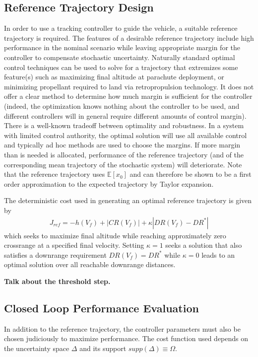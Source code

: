 \documentclass[10pt,a4paper]{article}
\begin{document}
		

	\subsection{Reference Trajectory Design}
	In order to use a tracking controller to guide the vehicle, a suitable reference trajectory is required. The features of a desirable reference trajectory include high performance in the nominal scenario while leaving appropriate margin for the controller to compensate stochastic uncertainty. Naturally standard optimal control techniques can be used to solve for a trajectory that extremizes some feature(s) such as maximizing final altitude at parachute deployment, or minimizing propellant required to land via retropropulsion technology. It does not offer a clear method to determine how much margin is sufficient for the controller (indeed, the optimization knows nothing about the controller to be used, and different controllers will in general require different amounts of control margin). There is a well-known tradeoff between optimality and robustness. In a system with limited control authority, the optimal solution will use all available control and typically ad hoc methods are used to choose the margins. If more margin than is needed is allocated, performance of the reference trajectory (and of the corresponding mean trajectory of the stochastic system) will deteriorate. Note that the reference trajectory uses $ \mathbb{E}[x_0] $ and can therefore be shown to be a first order approximation to the expected trajectory by Taylor expansion.
	
	The deterministic cost used in generating an optimal reference trajectory is given by 
	\begin{align}
	J_{ref} = -h(V_f) + |CR(V_f)| + \kappa|DR(V_f)-DR^*| \label{eq_cost_deterministic}
	\end{align}
	which seeks to maximize final altitude while reaching approximately zero crossrange at a specified final velocity. Setting $\kappa=1$ seeks a solution that also satisfies a downrange requirement $DR(V_f)=DR^*$ while $\kappa=0$ leads to an optimal solution over all reachable downrange distances. 
	
	\textbf{Talk about the threshold step.}
			
	\subsection{Closed Loop Performance Evaluation}		
	In addition to the reference trajectory, the controller parameters must also be chosen judiciously to maximize performance. The cost function used depends on the uncertainty space $ \Delta $ and its support $supp(\Delta)\equiv\Omega$.		
			
\end{document}
